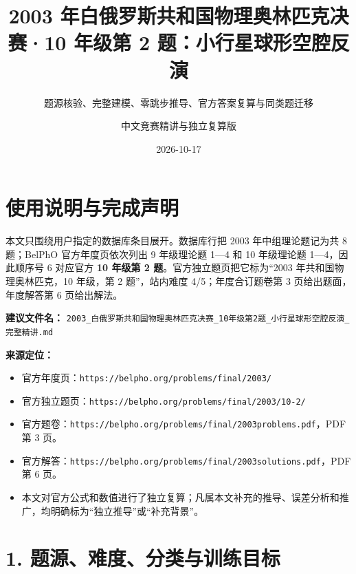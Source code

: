 \documentclass[
  11pt,
  UTF8]{ctexart}
\title{2003 年白俄罗斯共和国物理奥林匹克决赛·10 年级第 2
题：小行星球形空腔反演}
\subtitle{题源核验、完整建模、零跳步推导、官方答案复算与同类题迁移}
\author{中文竞赛精讲与独立复算版}
\date{2026-10-17}
\providecommand{\tightlist}{%
  \setlength{\itemsep}{0pt}\setlength{\parskip}{0pt}}
\begin{document}
\maketitle

{
\setcounter{tocdepth}{3}
\tableofcontents
}
\hypertarget{ux4f7fux7528ux8bf4ux660eux4e0eux5b8cux6210ux58f0ux660e}{%
\section{使用说明与完成声明}\label{ux4f7fux7528ux8bf4ux660eux4e0eux5b8cux6210ux58f0ux660e}}

本文只围绕用户指定的数据库条目展开。数据库行把 2003 年中组理论题记为共 8
题；BelPhO 官方年度页依次列出 9 年级理论题 1---4 和 10 年级理论题
1---4，因此顺序号 6 对应官方 \textbf{10 年级第 2
题}。官方独立题页把它标为``2003 年共和国物理奥林匹克，10 年级，第 2
题''，站内难度 4/5；年度合订题卷第 3 页给出题面，年度解答第 6
页给出解法。

\textbf{建议文件名：}
\texttt{2003\_白俄罗斯共和国物理奥林匹克决赛\_10年级第2题\_小行星球形空腔反演\_完整精讲.md}

\textbf{来源定位：}

\begin{itemize}
\tightlist
\item
  官方年度页：\texttt{https://belpho.org/problems/final/2003/}
\item
  官方独立题页：\texttt{https://belpho.org/problems/final/2003/10-2/}
\item
  官方题卷：\texttt{https://belpho.org/problems/final/2003problems.pdf}，PDF
  第 3 页。
\item
  官方解答：\texttt{https://belpho.org/problems/final/2003solutions.pdf}，PDF
  第 6 页。
\item
  本文对官方公式和数值进行了独立复算；凡属本文补充的推导、误差分析和推广，均明确标为``独立推导''或``补充背景''。
\end{itemize}

\hypertarget{ux9898ux6e90ux96beux5ea6ux5206ux7c7bux4e0eux8badux7ec3ux76eeux6807}{%
\section{1.
题源、难度、分类与训练目标}\label{ux9898ux6e90ux96beux5ea6ux5206ux7c7bux4e0eux8badux7ec3ux76eeux6807}}
\end{document}
